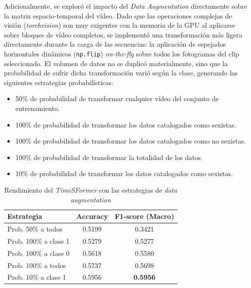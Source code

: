 Adicionalmente, se exploró el impacto del \textit{Data Augmentation} directamente sobre la matriz espacio-temporal del vídeo. Dado que las operaciones complejas de visión (\textit{torchvision}) son muy exigentes con la memoria de la GPU al aplicarse sobre bloques de vídeo completos, se implementó una transformación más ligera directamente durante la carga de las secuencias: la aplicación de espejados horizontales dinámicos (\texttt{np.flip}) \textit{on-the-fly} sobre todos los fotogramas del clip seleccionado. El volumen de datos no se duplicó materialmente, sino que la probabilidad de sufrir dicha transformación varió según la clase, generando las siguientes estrategias probabilísticas:
\begin{itemize}
    \item 50\% de probabilidad de transformar cualquier vídeo del conjunto de entrenamiento.
    \item 100\% de probabilidad de transformar los datos catalogados como sexistas.
    \item 100\% de probabilidad de transformar los datos catalogados como no sexistas.
    \item 100\% de probabilidad de transformar la totalidad de los datos.
    \item 10\% de probabilidad de transformar los datos catalogados como sexistas.

\end{itemize}

\begin{table}[H]
    \centering
    \begin{tabular}{lcc}
        \toprule
        \textbf{Estrategia} & \textbf{Accuracy} & \textbf{F1-score (Macro)} \\
        \midrule 
            Prob. 50\% a todos  & 0.5199 & 0.3421 \\
            Prob. 100\% a clase 1   & 0.5279 & 0.5277 \\
            Prob. 100\% a clase 0   & 0.5618 & 0.5580 \\
            Prob. 100\% a todos   & 0.5737 & 0.5698 \\
            Prob. 10\% a clase 1   & 0.5956 & \textbf{0.5956} \\
        \bottomrule
    \end{tabular}
    \caption{Rendimiento del \textit{TimeSFormer} con las estrategias de \textit{data augmentation}}
    \label{tab:ResultadosModelosVisionTemporalDataAugmentation}
\end{table}

